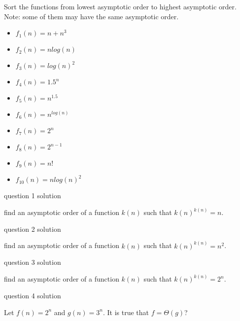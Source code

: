 \documentclass[12pt]{article}
\begin{document}
\begin{question}
Sort the functions from lowest asymptotic order to highest asymptotic order. Note: some of them may have the same asymptotic order.

\begin{itemize}
\item $f_{1}(n) = n + n^{3}$
\item $f_{2}(n) = nlog(n)$
\item $f_{3}(n) = log(n)^2$
\item $f_{4}(n) = 1.5^n$
\item $f_{5}(n) = n^{1.5}$
\item $f_{6}(n) = n^{log(n)}$
\item $f_{7}(n) = 2^{n}$
\item $f_{8}(n) = 2^{n-1}$
\item $f_{9}(n) = n!$
\item $f_{10}(n) = n log(n)^2$
\end{itemize}

\end{question}

\begin{solution}
question 1 solution
\end{solution}

\begin{question}
find an asymptotic order of a function $k(n)$ such that $k(n)^{k(n)} = n$.
\end{question}

\begin{solution}
question 2 solution
\end{solution}

\begin{question}
find an asymptotic order of a function $k(n)$ such that $k(n)^{k(n)} = n^{2}$.
\end{question}

\begin{solution}
question 3 solution
\end{solution}

\begin{question}
find an asymptotic order of a function $k(n)$ such that $k(n)^{k(n)} = 2^{n}$.
\end{question}

\begin{solution}
question 4 solution
\end{solution}

\begin{question}
Let $f(n) = 2^{n}$ and $g(n) = 3^{n}$. It is true that $f = \Theta(g)$?
\end{question}
\end{document}
